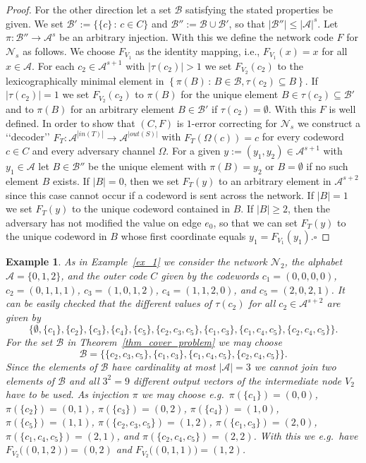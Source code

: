 \documentclass[11pt]{article}
\newcommand{\cA}{\mathcal{A}}
\newcommand{\cN}{\mathcal{N}}
\newtheorem{example}[theorem]{Example}
\begin{document}
\begin{proof}
  For the other direction let a set $\mathcal{B}$ satisfying the stated properties be given. We set $\mathcal{B'}:=\big\{\{c\}\,:\,c\in C\big\}$ and $\mathcal{B}'':=\mathcal{B}\cup\mathcal{B}'$, so 
  that $|\mathcal{B}''|\le |\cA|^s$. Let $\pi\colon \mathcal{B}''\to\cA^s$ be an arbitrary injection. With this we define the network code $F$ for $\cN_s$ as follows. We choose 
  $F_{V_1}$ as the identity mapping, i.e., $F_{V_1}(x)=x$ for all $x\in\cA$. For each $c_2\in \cA^{s+1}$ with $|\tau(c_2)|> 1$ we set $F_{V_2}(c_2)$ to the lexicographically minimal element in 
  $\left\{\pi(B)\,:\, B\in\mathcal{B}, \tau(c_2)\subseteq B\right\}$. If $|\tau(c_2)|=1$ we set $F_{V_2}(c_2)$ to $\pi(B)$ for the unique element $B\in \tau(c_2)\subseteq \mathcal{B}'$ and 
  to $\pi(B)$ for an arbitrary element $B\in\mathcal{B}'$ if $\tau(c_2)=\emptyset$.  
  With this $F$ is well defined. In order to show that $(C,F)$ is $1$-error correcting for $\cN_s$ we construct a {\lq\lq}decoder{\rq\rq} $F_T\colon\cA^{|in(T)|}\to\cA^{|out(S)|}$ with 
  $F_T(\Omega(c))=c$ for every codeword $c\in C$ and every adversary channel $\Omega$. For a given $y:=\left(y_1,y_2\right)\in\cA^{s+1}$ with $y_1\in\cA$ let $B\in\mathcal{B}''$ be the unique 
  element with $\pi(B)=y_2$ or $B=\emptyset$ if no such element $B$ exists. If $|B|=0$, then we set $F_T(y)$ to an arbitrary element in $\cA^{s+2}$ since this case cannot occur if a codeword 
  is sent across the network. If $|B|=1$ we set $F_T(y)$ to the unique codeword contained in $B$. If $|B|\ge 2$, then the adversary has not modified the value on edge $e_0$, so that 
  we can set $F_T(y)$ to the unique codeword in $B$ whose first coordinate equals $y_1=F_{V_1}(y_1)$.\hfill{$\square$}      
\end{proof}

\begin{example}
  \label{ex_2}
  As in Example~\ref{ex_1} we consider the network $\cN_2$, the alphabet $\cA=\{0,1,2\}$, and the outer code $C$ given by the codewords 
  $c_1=(0,0,0,0)$, $c_2=(0,1,1,1)$, $c_3=(1,0,1,2)$, $c_4=(1,1,2,0)$, and $c_5=(2,0,2,1)$. It can be easily checked that 
  the different values of $\tau(c_2)$ for all $c_2\in\cA^{s+2}$ are given by  
  $$
    \Big\{
    \emptyset,     
    \{c_1\}, \{c_2\}, \{c_3\}, \{c_4\}, \{c_5\}, \{c_2,c_3,c_5\}, \{c_1,c_3\}, \{c_1,c_4,c_5\}, \{c_2,c_4,c_5\}
    \Big\}.
  $$   
  For the set $\mathcal{B}$ in Theorem~\ref{thm_cover_problem} we may choose 
  $$
    \mathcal{B}=\big\{\{c_2,c_3,c_5\}, \{c_1,c_3\}, \{c_1,c_4,c_5\}, \{c_2,c_4,c_5\}\big\}.
  $$
  Since the elements of $\mathcal{B}$ have cardinality at most $|\cA|=3$ we cannot join two elements of $\mathcal{B}$ 
  and all $3^2=9$ different output vectors of the intermediate node $V_2$ have to be used. As injection $\pi$ we may choose e.g.\  
  $\pi(\{c_1\})=(0,0)$, $\pi(\{c_2\})=(0,1)$, $\pi(\{c_3\})=(0,2)$, $\pi(\{c_4\})=(1,0)$, $\pi(\{c_5\})=(1,1)$, $\pi(\{c_2,c_3,c_5\})=(1,2)$, 
  $\pi(\{c_1,c_3\})=(2,0)$, $\pi(\{c_1,c_4,c_5\})=(2,1)$, and $\pi(\{c_2,c_4,c_5\})=(2,2)$. With this we e.g.\ have $F_{V_2}\big((0,1,2)\big)=(0,2)$ 
  and $F_{V_2}\big((0,1,1)\big)=(1,2)$.  
\end{example}  
\end{document}
